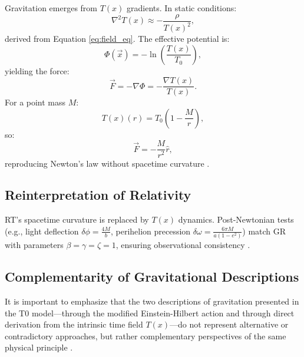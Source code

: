 \documentclass[twocolumn,aps,prl]{revtex4-2}
\newcommand{\Tfield}{T(x)}
\newcommand{\Tzero}{T_0}
\newcommand{\vecx}{\vec{x}}
\begin{document}
	Gravitation emerges from \(\Tfield\) gradients. In static conditions:
	\begin{equation}
		\nabla^2\Tfield \approx -\frac{\rho}{\Tfield^2},
		\label{eq:static_field}
	\end{equation}
	derived from Equation \ref{eq:field_eq}. The effective potential is:
	\begin{equation}
		\Phi(\vecx) = -\ln\left(\frac{\Tfield}{\Tzero}\right),
		\label{eq:grav_potential_def}
	\end{equation}
	yielding the force:
	\begin{equation}
		\vec{F} = -\nabla\Phi = -\frac{\nabla\Tfield}{\Tfield}.
		\label{eq:force_from_potential}
	\end{equation}
	For a point mass \(M\):
	\begin{equation}
		\Tfield(r) = \Tzero\left(1 - \frac{M}{r}\right),
		\label{eq:time_field_point_mass}
	\end{equation}
	so:
	\begin{equation}
		\vec{F} = -\frac{M}{r^2} \hat{r},
		\label{eq:newton_law}
	\end{equation}
	reproducing Newton’s law without spacetime curvature \cite{pascher_emergente_2025}.
	
	\subsection{Reinterpretation of Relativity}
	\label{subsec:rt_reinterpretation}
	
	RT’s spacetime curvature is replaced by \(\Tfield\) dynamics. Post-Newtonian tests (e.g., light deflection \(\delta\phi = \frac{4M}{b}\), perihelion precession \(\delta\omega = \frac{6\pi M}{a(1-e^2)}\)) match GR with parameters \(\beta = \gamma = \zeta = 1\), ensuring observational consistency \cite{Will2014}.
	\subsection{Complementarity of Gravitational Descriptions}
	\label{subsec:grav_complementarity}
	
	It is important to emphasize that the two descriptions of gravitation presented in the T0 model—through the modified Einstein-Hilbert action and through direct derivation from the intrinsic time field $\Tfield$—do not represent alternative or contradictory approaches, but rather complementary perspectives of the same physical principle \cite{pascher_emergente_2025}. 
	
\end{document}
